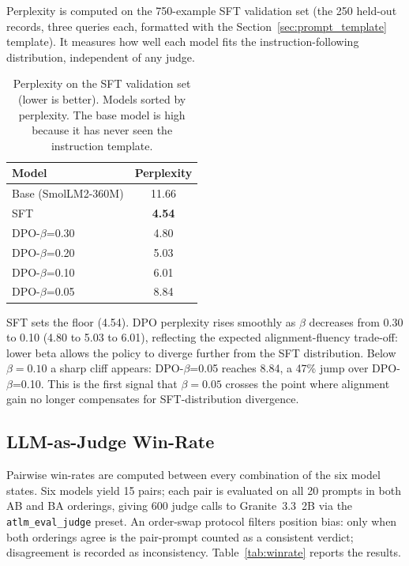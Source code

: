 \documentclass[../main.tex]{subfiles}
\begin{document}
Perplexity is computed on the 750-example SFT validation set (the 250 held-out records, three queries each, formatted with the Section~\ref{sec:prompt_template} template). It measures how well each model fits the instruction-following distribution, independent of any judge.

\begin{table}[h]
\centering
\small
\begin{tabular}{lc}
\toprule
\textbf{Model} & \textbf{Perplexity} \\
\midrule
Base (SmolLM2-360M)  & 11.66 \\
SFT                  & \textbf{4.54} \\
DPO-$\beta$=0.30     & 4.80 \\
DPO-$\beta$=0.20     & 5.03 \\
DPO-$\beta$=0.10     & 6.01 \\
DPO-$\beta$=0.05     & 8.84 \\
\bottomrule
\end{tabular}
\caption{Perplexity on the SFT validation set (lower is better). Models sorted by perplexity. The base model is high because it has never seen the instruction template.}
\label{tab:perplexity}
\end{table}

SFT sets the floor (4.54). DPO perplexity rises smoothly as $\beta$ decreases from 0.30 to 0.10 (4.80 to 5.03 to 6.01), reflecting the expected alignment-fluency trade-off: lower beta allows the policy to diverge further from the SFT distribution. Below $\beta = 0.10$ a sharp cliff appears: DPO-$\beta$=0.05 reaches 8.84, a 47\% jump over DPO-$\beta$=0.10. This is the first signal that $\beta = 0.05$ crosses the point where alignment gain no longer compensates for SFT-distribution divergence.

\subsection{LLM-as-Judge Win-Rate}
\label{sec:eval_winrate}

Pairwise win-rates are computed between every combination of the six model states. Six models yield 15 pairs; each pair is evaluated on all 20 prompts in both AB and BA orderings, giving 600 judge calls to Granite~3.3~2B via the \texttt{atlm\_eval\_judge} preset. An order-swap protocol filters position bias: only when both orderings agree is the pair-prompt counted as a consistent verdict; disagreement is recorded as inconsistency. Table~\ref{tab:winrate} reports the results.
\end{document}
